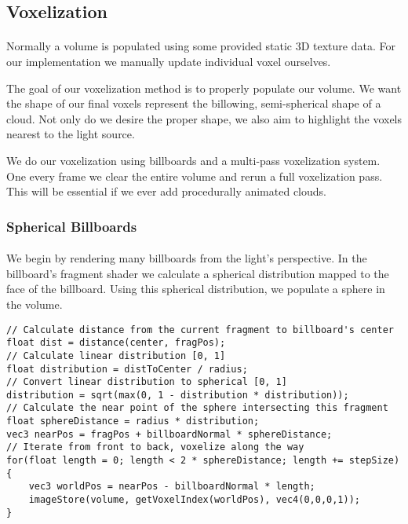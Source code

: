 \subsection{Voxelization}\paragraph{}
Normally a volume is populated using some provided static 3D texture data.  For our implementation we manually update individual voxel ourselves. 

The goal of our voxelization method is to properly populate our volume. We want the shape of our final voxels represent the billowing, semi-spherical shape of a cloud. Not only do we desire the proper shape, we also aim to highlight the voxels nearest to the light source. 

We do our voxelization using billboards and a multi-pass voxelization system. One every frame we clear the entire volume and rerun a full voxelization pass. This will be essential if we ever add procedurally animated clouds. 

\subsubsection{Spherical Billboards}\paragraph{}
We begin by rendering many billboards from the light's perspective. In the billboard's fragment shader we calculate a spherical distribution mapped to the face of the billboard. Using this spherical distribution, we populate a sphere in the volume. 

\begin{lstlisting}[caption={first\_voxelize.glsl, 42}]
// Calculate distance from the current fragment to billboard's center
float dist = distance(center, fragPos);
// Calculate linear distribution [0, 1]
float distribution = distToCenter / radius;
// Convert linear distribution to spherical [0, 1]
distribution = sqrt(max(0, 1 - distribution * distribution));
// Calculate the near point of the sphere intersecting this fragment
float sphereDistance = radius * distribution;
vec3 nearPos = fragPos + billboardNormal * sphereDistance;
// Iterate from front to back, voxelize along the way
for(float length = 0; length < 2 * sphereDistance; length += stepSize) {
	vec3 worldPos = nearPos - billboardNormal * length;
	imageStore(volume, getVoxelIndex(worldPos), vec4(0,0,0,1));
}
\end{lstlisting}\paragraph{}


